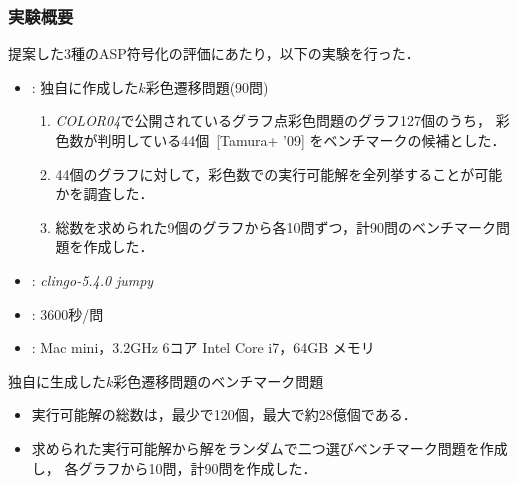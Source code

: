 \documentclass[dvipdfmx,11pt]{beamer}
\begin{document}
\begin{frame}\frametitle{実験概要}
  提案した3種のASP符号化の評価にあたり，以下の実験を行った．
  \bigskip
  \begin{itemize}
    \item {}: 独自に作成した$k$彩色遷移問題(90問)
      \begin{enumerate}
      \item \textit{COLOR04}で公開されているグラフ点彩色問題のグラフ127個のうち，
      彩色数が判明している44個~[Tamura+ '09] をベンチマークの候補とした．
      \item 44個のグラフに対して，彩色数での実行可能解を全列挙することが可能
            かを調査した．
      \item 総数を求められた9個のグラフから各10問ずつ，計90問のベンチマーク問題を作成した．
      \end{enumerate}

    \item {}: \textit{clingo-5.4.0} \textit{jumpy}
    \item {}: 3600秒/問
    \item {}: Mac mini，3.2GHz 6コア Intel Core i7，64GB メモリ
  \end{itemize}
  
\end{frame}


\begin{frame}{独自に生成した$k$彩色遷移問題のベンチマーク問題}

  \begin{table}[t]
    \centering
    
  \end{table}

  \begin{itemize}
  \item 実行可能解の総数は，最少で120個，最大で約28億個である．
  \item 求められた実行可能解から解をランダムで二つ選びベンチマーク問題を作成し，
        各グラフから10問，計90問を作成した．
  \end{itemize}

\end{frame}
\end{document}
